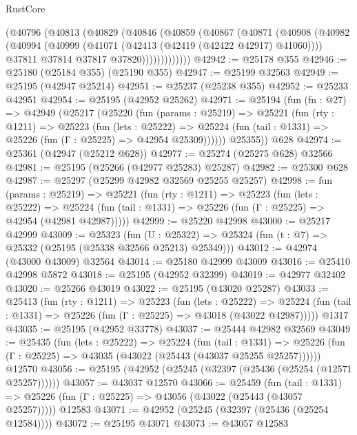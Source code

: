 \begin{lexlean}{RustCore}
\begin{coremodule}
          (@40796
            (@40813
              (@40829
                (@40846
                  (@40859
                    (@40867
                      (@40871
                        (@40908
                          (@40982
                            (@40994
                              (@40999 (@41071 (@42413 (@42419 (@42422 @42917) @41060))))
                              @37811
                              @37814
                              @37817
                              @37820)))))))))))))
@42942 := @25178 @355
@42946 := @25180 (@25184 @355) (@25190 @355)
@42947 := @25199 @32563
@42949 := @25195 (@42947 @25214)
@42951 := @25237 (@25238 @355)
@42952 := @25233 @42951
@42954 := @25195 (@42952 @25262)
@42971 := @25194
    (fun (fn : @27) =>
    @42949
      (@25217
        (@25220
          (fun (params : @25219) =>
          @25221
            (fun (rty : @1211) =>
            @25223
              (fun (lets : @25222) =>
              @25224 (fun (tail : @1331) => @25226 (fun (Γ : @25225) => @42954 @25309))))))
        @25355))
    @628
@42974 := @25361 (@42947 (@25212 @628))
@42977 := @25274 (@25275 @628) @32566
@42981 := @25195 (@25266 (@42977 @25283) @25287)
@42982 := @25300 @628
@42987 := @25297 (@25299 @42982 @32569 @25255 @25257)
@42998 := fun (params : @25219) =>
  @25221
    (fun (rty : @1211) =>
    @25223
      (fun (lets : @25222) =>
      @25224 (fun (tail : @1331) => @25226 (fun (Γ : @25225) => @42954 (@42981 @42987)))))
@42999 := @25220 @42998
@43000 := @25217 @42999
@43009 := @25323
    (fun (U : @25322) => @25324 (fun (t : @7) => @25332 (@25195 (@25338 @32566 @25213) @25349)))
@43012 := @42974 (@43000 @43009) @32564
@43014 := @25180 @42999 @43009
@43016 := @25410 @42998 @5872
@43018 := @25195 (@42952 @32399)
@43019 := @42977 @32402
@43020 := @25266 @43019
@43022 := @25195 (@43020 @25287)
@43033 := @25413
    (fun (rty : @1211) =>
    @25223
      (fun (lets : @25222) =>
      @25224 (fun (tail : @1331) => @25226 (fun (Γ : @25225) => @43018 (@43022 @42987)))))
    @1317
@43035 := @25195 (@42952 @33778)
@43037 := @25444 @42982 @32569
@43049 := @25435
    (fun (lets : @25222) =>
    @25224
      (fun (tail : @1331) =>
      @25226 (fun (Γ : @25225) => @43035 (@43022 (@25443 (@43037 @25255 @25257))))))
    @12570
@43056 := @25195 (@42952 (@25245 (@32397 (@25436 (@25254 (@12571 @25257))))))
@43057 := @43037 @12570
@43066 := @25459
    (fun (tail : @1331) => @25226 (fun (Γ : @25225) => @43056 (@43022 (@25443 (@43057 @25257)))))
    @12583
@43071 := @42952 (@25245 (@32397 (@25436 (@25254 @12584))))
@43072 := @25195 @43071
@43073 := @43057 @12583

\end{coremodule}
\end{lexlean}
